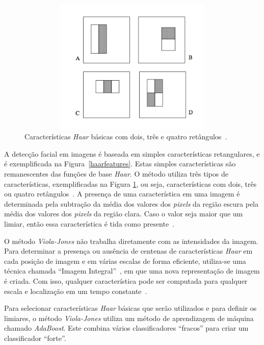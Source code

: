 	\begin{figure}[H]
		\begin{center}
			\includegraphics[height=6.5cm,width=12.5cm]{figuras/2.FundamentacaoTeorica/haarfeaturestypes.png}
		\end{center}
		\caption{Características \textit{Haar} básicas com dois, três e quatro retângulos~\cite{violajones}.}
		\label{haarfeaturestypes}
	\end{figure}

	A detecção facial em imagens é baseada em simples características
	retangulares, e é exemplificada na Figura~\ref{haarfeatures}. Estas simples
	características são remanescentes das funções de base \textit{Haar}. O método
	utiliza três tipos de características, exemplificadas na Figura
	\ref{haarfeaturestypes}, ou seja, características com dois, três ou quatro
	retângulos~\cite{violajones}. A presença de uma característica em uma imagem é
	determinada pela subtração da média dos valores dos \textit{pixels} da região
	escura pela média dos valores dos \textit{pixels} da região clara. Caso o
	valor seja maior que um limiar, então essa característica é tida como
	presente~\cite{servodetection}.

	O método \textit{Viola-Jones} não trabalha diretamente com as intensidades da
	imagem. Para determinar a presença ou ausência de centenas de características
	\textit{Haar} em cada posição de imagem e em várias escalas de forma eficiente,
	utiliza-se uma técnica chamada ``Imagem Integral''~\cite{servodetection,
	violajones}, em que uma nova representação de imagem é criada. Com isso,
	qualquer característica pode ser computada para qualquer escala e localização em
	um tempo constante~\cite{violajones}.

	Para selecionar características \textit{Haar} básicas que serão utilizados e
	para definir os limiares, o método \textit{Viola-Jones} utiliza um método de
	aprendizagem de máquina chamado \textit{AdaBoost}. Este combina vários
	classificadores ``fracos'' para criar um classificador ``forte''.
	
